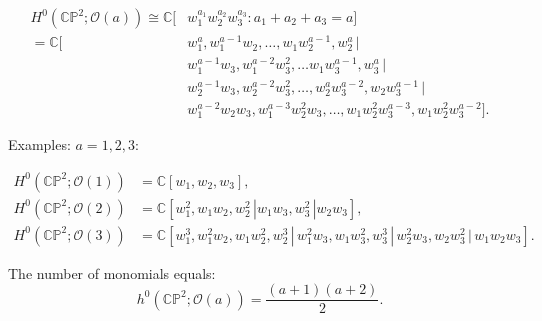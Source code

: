 \documentclass[11pt]{article}
\begin{document}
 \begin{equation*}
 	\begin{split}
 		H^{0}\left(\mathbb{CP}^{2}; \mathcal{O}(a)\right) \cong \mathbb{C}[&w_{1}^{a_{1}}w_{2}^{a_{2}}w_{3}^{a_{3}} : a_{1} + a_{2} + a_{3} = a] \\
 		= \mathbb{C}[&w_{1}^{a}, w_{1}^{a-1}w_{2}, \ldots, w_{1}w_{2}^{a-1}, w_{2}^{a} \, | \\
 		&w_{1}^{a-1}w_{3}, w_{1}^{a-2}w_{3}^{2}, \ldots w_{1}w_{3}^{a-1}, w_{3}^{a} \, | \\
 		&w_{2}^{a-1}w_{3}, w_{2}^{a-2}w_{3}^{2}, \ldots, w_{2}^{a}w_{3}^{a-2}, w_{2}w_{3}^{a-1} \, | \\
 		&w_{1}^{a-2}w_{2}w_{3}, w_{1}^{a-3}w_{2}^{2}w_{3}, \ldots, w_{1}w_{2}^{2}w_{3}^{a-3}, w_{1}w_{2}^{2}w_{3}^{a-2}].
 	\end{split}
 \end{equation*}

Examples: $a = 1, 2, 3$:
 
 \begin{equation*}
 	\begin{split}
 		H^{0}\left(\mathbb{CP}^{2}; \mathcal{O}(1)\right) &= \mathbb{C}[w_{1}, w_{2}, w_{3}], \\
 		H^{0}\left(\mathbb{CP}^{2}; \mathcal{O}(2)\right) &= \mathbb{C}[w_{1}^{2}, w_{1}w_{2}, w_{2}^{2} \, | w_{1}w_{3}, w_{3}^{2} \, | w_{2}w_{3} ], \\
 		H^{0}\left(\mathbb{CP}^{2}; \mathcal{O}(3)\right) &= \mathbb{C}[w_{1}^{3}, w_{1}^{2}w_{2}, w_{1}w_{2}^{2}, w_{2}^{3}\, | \, w_{1}^{2}w_{3}, w_{1}w_{3}^{2}, w_{3}^{3} \, | \,  w_{2}^{2}w_{3}, w_{2}w_{3}^{2}  \, | \, w_{1}w_{2}w_{3}]. 	 		
 	\end{split}
 \end{equation*}
 
The number of monomials equals:
\begin{equation*}
	h^{0}(\mathbb{CP}^{2}; \mathcal{O}(a)) = \frac{(a+1)(a+2)}{2}.
\end{equation*}
 
 
 
 
 
 
 
 
 
 















    
    
    
\end{document}
